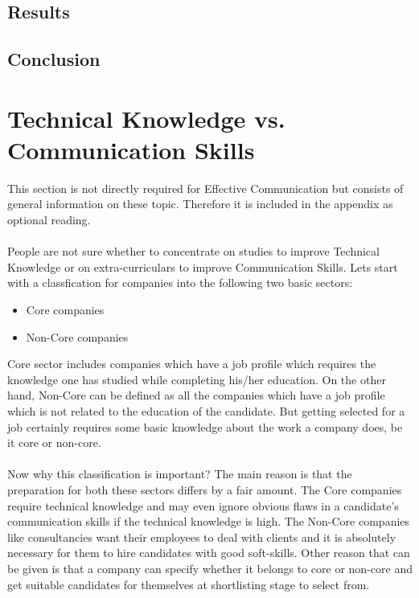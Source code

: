 \documentclass[a4paper,12pt]{report}
\begin{document}
\section{Results}
\section{Conclusion}
\appendix
\chapter{Technical Knowledge vs. Communication Skills}
This section is not directly required for Effective Communication but consists of general information on
these topic. Therefore it is included in the appendix as optional reading.
\subsubsection{}
People are not sure whether to concentrate on studies to improve Technical Knowledge or on extra-curriculars
 to improve Communication Skills. Lets start with a classfication for companies into the following two basic sectors:
\begin{itemize}
 \item Core companies
 \item Non-Core companies
\end{itemize}
Core sector includes companies which have a job profile which requires the knowledge one has studied 
while completing his/her education. On the other hand, Non-Core can be defined as all the companies which 
have a job profile which is not related to the education of the candidate. But getting selected for a job
certainly requires some basic knowledge about the work a company does, be it core or non-core.
\subsubsection{}
Now why this classification is important? The main reason is that the preparation for both these sectors
 differs by a fair amount. The Core companies require technical knowledge and may even ignore obvious flaws in
a candidate's communication skills if the technical knowledge is high. The Non-Core companies like consultancies
want their employees to deal with clients and it is absolutely necessary for them to hire candidates with good
soft-skills. Other reason that can be given is that a company can specify whether it belongs to core or non-core
and get suitable candidates for themselves at shortlisting stage to select from.
\end{document}
